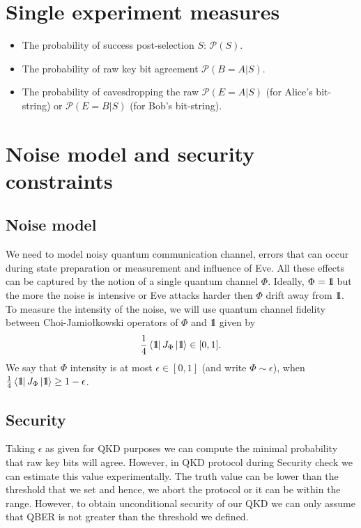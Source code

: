 \documentclass[12pt,a4paper,reqno, aps, superscriptaddress]{amsart}
\newcommand{\Id}{{\rm 1\hspace{-0.9mm}l}}
\newcommand{\PP}{\ensuremath{\mathcal{P}}}
\begin{document}
\section{Single experiment measures}
\begin{itemize}
    \item The probability of success post-selection $S$: $\PP(S)$.
    \item The probability of raw key bit agreement $\PP(B=A|S)$.
    \item The probability of eavesdropping the raw $\PP(E=A|S)$ (for Alice's 
    bit-string) or $\PP(E=B|S)$ (for Bob's bit-string).
\end{itemize}

\section{Noise model and security constraints}
\subsection{Noise model}
We need to model noisy quantum communication channel, errors that can occur 
during state preparation or measurement and influence of Eve. All these effects 
can be captured by the notion of a single quantum channel $\Phi$. Ideally, 
$\Phi=\Id$ but the more the noise is intensive or Eve attacks harder then 
$\Phi$ drift away from $\Id$. To measure the intensity of the noise, we will 
use quantum channel fidelity between Choi-Jamio{\l}kowski operators of $\Phi$ 
and $\Id$ given by 
\begin{equation}
\frac14 \bra{\Id} J_\Phi \ket{\Id} \in [0,1].
\end{equation}
We say that $\Phi$ intensity is at most $\epsilon \in [0,1]$ (and write $\Phi 
\sim \epsilon$), when $\frac14 
\bra{\Id} J_\Phi \ket{\Id} \ge 1-\epsilon$.

\subsection{Security}
Taking $\epsilon$ as given for QKD purposes we can compute the minimal 
probability that raw key bits will agree. However, in QKD protocol during 
Security check we can estimate this value experimentally. The truth value can 
be lower than the threshold that we set and hence, we abort the protocol or it 
can be within the range. However, to obtain unconditional security of our QKD 
we can only assume that QBER is not greater than the threshold we defined.
\end{document}
